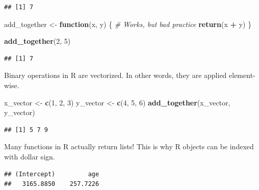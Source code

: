 \documentclass[openany]{book}
\newenvironment{Shaded}{\begin{snugshade}}{\end{snugshade}}
\newcommand{\CommentTok}[1]{\textcolor[rgb]{0.56,0.35,0.01}{\textit{#1}}}
\newcommand{\ControlFlowTok}[1]{\textcolor[rgb]{0.13,0.29,0.53}{\textbf{#1}}}
\newcommand{\DataTypeTok}[1]{\textcolor[rgb]{0.13,0.29,0.53}{#1}}
\newcommand{\DecValTok}[1]{\textcolor[rgb]{0.00,0.00,0.81}{#1}}
\newcommand{\KeywordTok}[1]{\textcolor[rgb]{0.13,0.29,0.53}{\textbf{#1}}}
\newcommand{\NormalTok}[1]{#1}
\newcommand{\OperatorTok}[1]{\textcolor[rgb]{0.81,0.36,0.00}{\textbf{#1}}}
\newcommand{\StringTok}[1]{\textcolor[rgb]{0.31,0.60,0.02}{#1}}
\begin{document}
\begin{verbatim}
## [1] 7
\end{verbatim}

\begin{Shaded}
\begin{Highlighting}[]
\NormalTok{add_together <-}\StringTok{ }\ControlFlowTok{function}\NormalTok{(x, y) \{}
  \CommentTok{# Works, but bad practice}
  \KeywordTok{return}\NormalTok{(x }\OperatorTok{+}\StringTok{ }\NormalTok{y)}
\NormalTok{\}}

\KeywordTok{add_together}\NormalTok{(}\DecValTok{2}\NormalTok{, }\DecValTok{5}\NormalTok{)}
\end{Highlighting}
\end{Shaded}

\begin{verbatim}
## [1] 7
\end{verbatim}

Binary operations in R are vectorized. In other words, they are applied element-wise.

\begin{Shaded}
\begin{Highlighting}[]
\NormalTok{x_vector <-}\StringTok{ }\KeywordTok{c}\NormalTok{(}\DecValTok{1}\NormalTok{, }\DecValTok{2}\NormalTok{, }\DecValTok{3}\NormalTok{)}
\NormalTok{y_vector <-}\StringTok{ }\KeywordTok{c}\NormalTok{(}\DecValTok{4}\NormalTok{, }\DecValTok{5}\NormalTok{, }\DecValTok{6}\NormalTok{)}
\KeywordTok{add_together}\NormalTok{(x_vector, y_vector)}
\end{Highlighting}
\end{Shaded}

\begin{verbatim}
## [1] 5 7 9
\end{verbatim}

Many functions in R actually return lists! This is why R objects can be indexed
with dollar sign.

\begin{Shaded}
\end{Shaded}

\begin{verbatim}
## (Intercept)         age 
##   3165.8850    257.7226
\end{verbatim}
\end{document}
